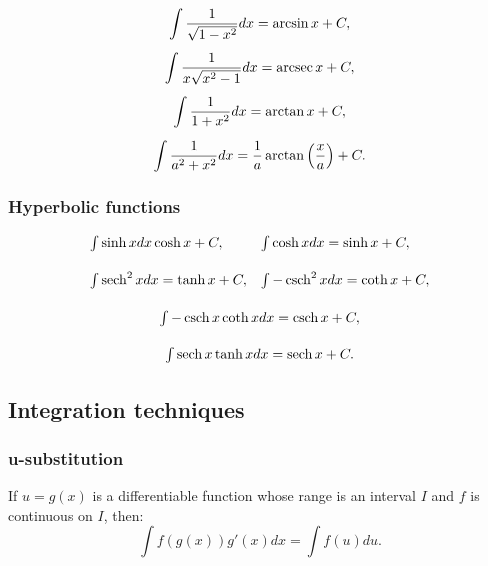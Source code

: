 \[
    \begin{array}{c}
        \displaystyle\int \dfrac{1}{\sqrt{1 - x^2}}dx = \arcsin x + C,\\[0.5cm]
        \displaystyle\int \dfrac{1}{x\sqrt{x^2 - 1}}dx = \arcsec x + C,\\[0.5cm]
        \displaystyle \int \dfrac{1}{1+x^2} dx = \arctan x + C,\\[0.5cm]
        \displaystyle \int \dfrac{1}{a^2 + x^2} dx = \dfrac{1}{a} \arctan \left(\dfrac{x}{a}\right) + C.
    \end{array}  
\]

\subsubsection*{Hyperbolic functions}

\[
    \begin{array}{c}        
        \displaystyle\begin{array}{ll}
            \int \sinh x dx \cosh x + C, & \int \cosh x dx = \sinh x + C, \\[0.5cm]
            \int \sech^2 x dx = \tanh x + C, & \int -\csch^2 x dx = \coth x + C,
        \end{array}  \\[1cm]
        \int -\csch x \coth x dx = \csch x + C,\\[0.5cm]
        \int \sech x \tanh x dx = \sech x + C.
    \end{array}
\]

\subsection*{Integration techniques}

\subsubsection*{u-substitution}
\par 
If $u = g(x)$ is a differentiable function whose range is an interval $I$ and $f$ is continuous on $I$, then:
\[
    \int f\left(g(x)\right)g'(x) dx = \int f(u)du.  
\]
